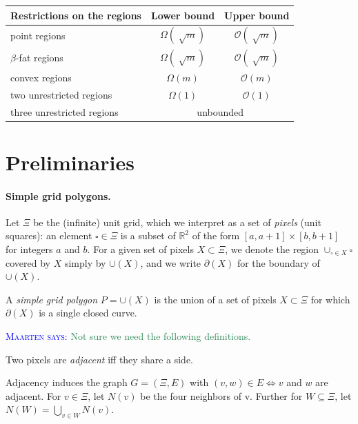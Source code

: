 \documentclass[a4paper, UKenglish]{lipics-v2018}
\newcommand{\mremark}[3]{\textcolor{blue}{\textsc{#1 #2:}} \textcolor{SeaGreen}{\textsf{#3}}}
\newcommand{\maarten}[2][says]{\mremark{Maarten}{#1}{#2}}
\newcommand{\bigo}{\ensuremath{\mathcal O}}
\newcommand{\pix}{\square}
\newcommand{\R}{\mathbb{R}}
\begin{document}
\begin{table}[H]
\begin{tabular}{lcc}
\toprule
Restrictions on the regions & Lower bound & Upper bound  \\ \midrule
point regions & $\Omega(\sqrt[]{m}) $ & $\bigo(\sqrt[]{m})$ \\
$\beta$-fat regions & $\Omega(\sqrt[]{m}) $ & $\bigo(\sqrt[]{m})$ \\
convex regions & $\Omega(m) $ & $\bigo(m)$ \\
two unrestricted regions &  $\Omega(1)$ & $\bigo(1)$\\
three unrestricted regions &  \multicolumn{2}{c}{unbounded}\\
\bottomrule
\end{tabular}
\end{table}


\section{Preliminaries}
\label {sec:prelims}

\paragraph {Simple grid polygons.}

Let $\Xi$ be the (infinite) unit grid, which we interpret as a set of {\em pixels} (unit squares): 
an element $\pix \in \Xi$ is a subset of $\R^2$ of the form $[a,a+1]\times[b,b+1]$ for integers $a$ and $b$.
For a given set of pixels $X \subset \Xi$, we denote the region $\cup_{\pix \in X}\pix$ covered by $X$ simply by $\cup(X)$, and we write $\partial(X)$ for the boundary of $\cup(X)$.

\begin{definition}
A {\em simple grid polygon} $P = \cup(X)$ is the union of a set of pixels $X \subset \Xi$ for which $\partial(X)$ is a single closed curve.
\end{definition}

\maarten {Not sure we need the following definitions.}

\begin{definition}
Two pixels are \emph{adjacent} iff they share a side.
\end{definition}

Adjacency induces the graph $G=(\Xi, E)$ with $(v, w)\in E \iff v$ and $w$ are adjacent.
For $v\in \Xi$, let $N(v)$ be the four neighbors of v. Further for $W\subseteq \Xi$, let $N(W)=\bigcup_{v\in W} N(v)$.
\end{document}
